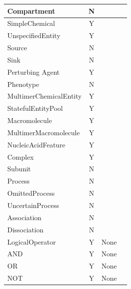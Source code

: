 \begin{center}
\label{tab:processduprules}
\begin{footnotesize}
\tablelasttail{\hline}
\begin{supertabular}{|l|c|p{4cm}|p{3.5cm}|}\hline
Compartment   & N & & \\\hline
SimpleChemical & Y &  & \\\hline
UnspecifiedEntity & Y &  & \\\hline
Source & N & & \\\hline
Sink & N & & \\\hline
Perturbing Agent & Y &  & \\\hline
Phenotype & N & & \\\hline
MultimerChemicalEntity & Y &  & \\\hline
StatefulEntityPool & Y &  & \\\hline
Macromolecule & Y &  & \\\hline
MultimerMacromolecule & Y &  & \\\hline
Nucleic\-Acid\-Feature & Y &  & \\\hline
Complex & Y &  & \\\hline
Subunit  & N & & \\\hline
Process & N & & \\\hline
OmittedProcess & N &  & \\\hline
UncertainProcess & N & & \\\hline
Association & N &  & \\\hline
Dissociation & N &  & \\\hline
LogicalOperator & Y & None & \\\hline
AND & Y & None & \\\hline
OR & Y & None & \\\hline
NOT & Y & None & \\\hline
\end{supertabular}
\end{footnotesize}
\end{center}


